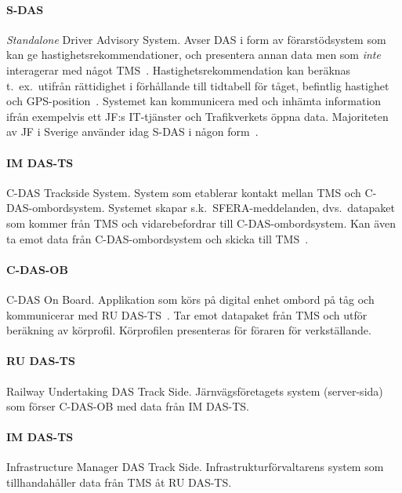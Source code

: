 \paragraph{S-DAS}
\emph{Standalone} Driver Advisory System.
Avser DAS i form av förarstödsystem som kan ge hastighetsrekommendationer, och presentera annan data men som \emph{inte} interagerar med något TMS~\cite{Joborn2023}.
Hastighetsrekommendation kan beräknas t.~ex.~utifrån rättidighet i förhållande till tidtabell för tåget, befintlig hastighet och GPS-position~\cite{Systemdefinition2019}.
Systemet kan kommunicera med och inhämta information ifrån exempelvis ett JF:s IT-tjänster och Trafikverkets öppna data.
Majoriteten av JF i Sverige använder idag S-DAS i någon form~\cite{Systemdefinition2019}.
\paragraph{IM DAS-TS}
C-DAS Trackside System.
System som etablerar kontakt mellan TMS och C-DAS-ombordsystem\cite{Olsson2023}.
Systemet skapar s.k.~SFERA-meddelanden, dvs.~datapaket som kommer från TMS och vidarebefordrar till C-DAS-ombordsystem.
Kan även ta emot data från C-DAS-ombordsystem och skicka till TMS\@~\cite{Olsson2023}.
\paragraph{C-DAS-OB}
C-DAS On Board.
Applikation som körs på digital enhet ombord på tåg och kommunicerar med RU DAS-TS\@~\cite{Olsson2023}.
Tar emot datapaket från TMS och utför beräkning av körprofil.
Körprofilen presenteras för föraren för verkställande.
\paragraph{RU DAS-TS}
Railway Undertaking DAS Track Side.
Järnvägsföretagets system (server-sida) som förser C-DAS-OB med data från IM DAS-TS\@.
\paragraph{IM DAS-TS}
Infrastructure Manager DAS Track Side.
Infrastrukturförvaltarens system som tillhandahåller data från TMS åt RU DAS-TS\@.

